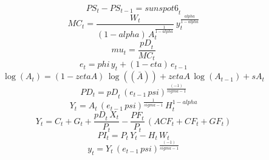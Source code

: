 \begin{dmath}
{PS}_{t}-{PS}_{t-1}={sunspot6}_{t}
\end{dmath}
\begin{dmath}
{MC}_{t}=\frac{{W}_{t}}{\left(1-{alpha}\right)\, {A}_{t}^{\frac{1}{1-{alpha}}}}\, {y}_{t}^{\frac{{alpha}}{1-{alpha}}}
\end{dmath}
\begin{dmath}
{mu}_{t}=\frac{{pD}_{t}}{{MC}_{t}}
\end{dmath}
\begin{dmath}
{e}_{t}={phi}\, {y}_{t}+\left(1-{eta}\right)\, {e}_{t-1}
\end{dmath}
\begin{dmath}
\log\left({A}_{t}\right)=\left(1-{zetaA}\right)\, \log\left((\bar{A})\right)+{zetaA}\, \log\left({A}_{t-1}\right)+{sA}_{t}
\end{dmath}
\begin{dmath}
{PD}_{t}={pD}_{t}\, \left({e}_{t-1}\, {psi}\right)^{\frac{\left(-1\right)}{{sigma}-1}}
\end{dmath}
\begin{dmath}
{Y}_{t}={A}_{t}\, \left({e}_{t-1}\, {psi}\right)^{\frac{1}{{sigma}-1}}\, {H}_{t}^{1-{alpha}}
\end{dmath}
\begin{dmath}
{Y}_{t}={C}_{t}+{G}_{t}+\frac{{pD}_{t}\, {X}_{t}}{{P}_{t}}-\frac{{PF}_{t}}{{P}_{t}}\, \left({ACF}_{t}+{CF}_{t}+{GF}_{t}\right)
\end{dmath}
\begin{dmath}
{PI}_{t}={P}_{t}\, {Y}_{t}-{H}_{t}\, {W}_{t}
\end{dmath}
\begin{dmath}
{y}_{t}={Y}_{t}\, \left({e}_{t-1}\, {psi}\right)^{\frac{\left(-1\right)}{{sigma}-1}}
\end{dmath}
